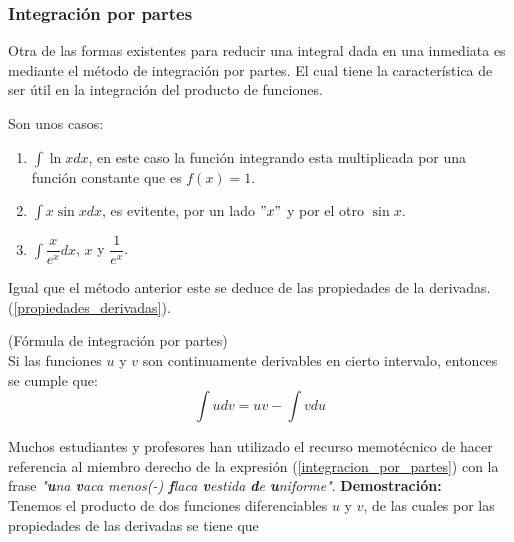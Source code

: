 \documentclass[10pt,twoside]{SelfArx} %
\begin{document}
 
 
 
 
 
 
 
 
 
 
 \subsubsection{Integración por partes}
 Otra de las formas existentes para reducir una integral dada en una inmediata es mediante el método de integración por partes. El cual tiene la característica de ser útil en la integración del producto de funciones.
 \begin{ejemplo}
 	Son unos casos:
 	\begin{enumerate}
 		\item $ \displaystyle\int\ln xdx $, en este caso la función integrando esta multiplicada por una función constante que es $ f(x)=1 $.
 		\item $ \displaystyle\int x\sin xdx $, es evitente, por un lado $ "x" $ y por el otro $ \sin x $.
 		\item $ \displaystyle\int \dfrac{x}{e^{x}}dx $, $ x $ y $ \dfrac{1}{e^{x}} $.
 	\end{enumerate}
  \end{ejemplo}
  Igual que el método anterior  este se deduce de las propiedades de la derivadas.(\ref{propiedades_derivadas}).
  \begin{teorema}
  	(Fórmula de integración por partes)\\
  	Si las funciones $ u $ y $ v $ son continuamente derivables en cierto intervalo, entonces se cumple que:
  	\begin{equation}
  	\int udv=uv-\int vdu\label{integracion_por_partes}
  	\end{equation}
  \end{teorema}
 Muchos estudiantes y profesores han utilizado el recurso memotécnico de hacer referencia al miembro derecho de la expresión (\ref{integracion_por_partes}) con la frase \textsl{"\textbf{u}na \textbf{v}aca menos(-) \textbf{f}laca \textbf{v}estida \textbf{d}e \textbf{u}niforme"}.
 \textbf{Demostración:}\\
 Tenemos el producto de dos funciones diferenciables $ u $ y $ v $, de las cuales por las propiedades de las derivadas se tiene que
\end{document}

